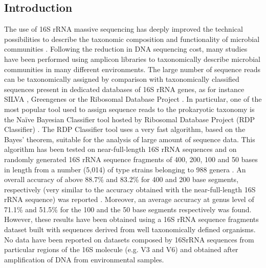 \subsection{Introduction}
The use of 16S rRNA massive sequencing has deeply improved the technical possibilities to describe the taxonomic composition and functionality of microbial communities \cite{degnan2011illumina}. Following the reduction in DNA sequencing cost, many studies have been performed using amplicon libraries to taxonomically describe microbial communities in many different environments. The large number of sequence reads can be taxonomically assigned by comparison with taxonomically classified sequences present in dedicated databases of 16S rRNA genes, as for instance SILVA \cite{quast2012silva}, Greengenes \cite{desantis2006greengenes} or the Ribosomal Database Project \cite{wang2007naive}. In particular, one of the most popular tool used to assign sequence reads to the prokaryotic taxonomy is the Na\"ive Bayesian Classifier tool hosted by Ribosomal Database Project (RDP Classifier) \cite{wang2007naive}. The RDP Classifier tool uses a very fast algorithm, based on the Bayes' theorem, suitable for the analysis of large amount of sequence data. This algorithm has been tested on near-full-length 16S rRNA sequences and on randomly generated 16S rRNA sequence fragments of 400, 200, 100 and 50 bases in length from a number (5,014) of type strains belonging to 988 genera \cite{wang2007naive}. An overall accuracy of above 88.7\% and 83.2\% for 400 and 200 base segments, respectively (very similar to the accuracy obtained with the near-full-length 16S rRNA sequence) was reported \cite{wang2007naive}. Moreover, an average accuracy at genus level of 71.1\% and 51.5\% for the 100 and the 50 base segments respectively was found. However, these results have been obtained using a 16S rRNA sequence fragments dataset built with sequences derived from well taxonomically defined organisms. No data have been reported on datasets composed by 16SrRNA sequences from particular regions of the 16S molecule (e.g. V3 and V6) and obtained after amplification of DNA from environmental samples. \\
